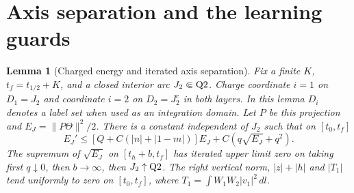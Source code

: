 \documentclass[11pt]{article}
\newtheorem{lemma}{Lemma}
\newcommand{\dd}{\,dl}
\begin{document}
\section{Axis separation and the learning guards}\label{an04ce5v2:guards}
\begin{lemma}[Charged energy and iterated axis separation]\label{an04ce5v2:axislemma}
Fix a finite $K$, $t_f=t_{1/2}+K$, and a closed interior arc $J_2\Subset{\rm Q2}$.
Charge coordinate $i=1$ on $D_1=J_2$ and coordinate $i=2$ on $D_2=J_2^c$ in both layers. In this lemma $D_i$ denotes a label set when used as an integration domain. Let $P$ be this projection and $E_J=\|P\Theta\|^2/2$. There is a constant independent of $J_2$ such that on $[t_0,t_f]$
\begin{equation}\label{an04ce5v2:defect}
 E_J'\le [Q+C(|n|+|1-m|)]E_J+C(q\sqrt{E_J}+q^2).
\end{equation}
The supremum of $\sqrt{E_J}$ on $[t_h+b,t_f]$ has iterated upper limit zero on taking first $q\downarrow0$, then $b\to\infty$, then $J_2\uparrow{\rm Q2}$. The right vertical norm, $|z|+|h|$ and $|T_1|$ tend uniformly to zero on $[t_0,t_f]$, where $T_1=\int W_1W_2|v_1|^2\dd$.
\end{lemma}
\end{document}
